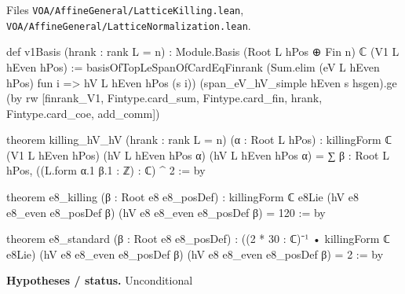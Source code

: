 \documentclass[11pt,openany]{book}
\newcommand{\leanpath}[1]{\texttt{\small #1}}
\theoremstyle{definition}
\theoremstyle{plain}
\begin{document}
{\raggedright\noindent Files \leanpath{VOA/\allowbreak AffineGeneral/\allowbreak LatticeKilling.lean},
\leanpath{VOA/\allowbreak AffineGeneral/\allowbreak LatticeNormalization.lean}.\par}
\begin{leancode}
def v1Basis (hrank : rank L = n) : Module.Basis (Root L hPos ⊕ Fin n) ℂ (V1 L hEven hPos) :=
  basisOfTopLeSpanOfCardEqFinrank (Sum.elim (eV L hEven hPos) fun i => hV L hEven hPos (s i))
    (span_eV_hV_simple hEven s hsgen).ge
    (by rw [finrank_V1, Fintype.card_sum, Fintype.card_fin, hrank, Fintype.card_coe, add_comm])

theorem killing_hV_hV (hrank : rank L = n) (α : Root L hPos) :
    killingForm ℂ (V1 L hEven hPos) (hV L hEven hPos α) (hV L hEven hPos α)
      = ∑ β : Root L hPos, ((L.form α.1 β.1 : ℤ) : ℂ) ^ 2 := by

theorem e8_killing (β : Root e8 e8_posDef) :
    killingForm ℂ e8Lie (hV e8 e8_even e8_posDef β) (hV e8 e8_even e8_posDef β) = 120 := by

theorem e8_standard (β : Root e8 e8_posDef) :
    ((2 * 30 : ℂ)⁻¹ • killingForm ℂ e8Lie) (hV e8 e8_even e8_posDef β)
      (hV e8 e8_even e8_posDef β) = 2 := by
\end{leancode}
\noindent\textbf{Hypotheses / status.} Unconditional\par
\medskip
\endgroup
\setcounter{chapter}{23}
\end{document}
